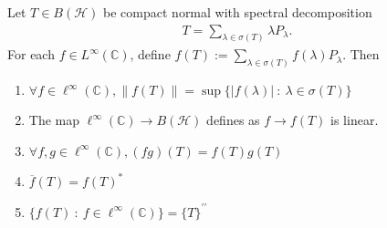 \begin{theorem}
  Let $T \in B(\mathcal{H})$ be compact normal with spectral decomposition
  \begin{align*}
    T = \sum_{\lambda \in  \sigma(T)} \lambda P_\lambda.
  \end{align*}
  For each $f \in L^\infty(\mathbb{C})$, define $f(T) := \sum_{ \lambda \in
  \sigma(T)}  f(\lambda)   P_\lambda$. Then
  \begin{enumerate}[label=(\arabic*)]
    \item $\forall f \in \ell^\infty(\mathbb{C}), \|f(T)\| = \sup \{
      |f(\lambda)|  \ : \  \lambda \in \sigma(T) \}$
    \item The map $\ell^\infty(\mathbb{C}) \to B(\mathcal{H})$
      defines as $f \to f(T)$ is linear.
    \item $\forall f, g \in \ell^\infty(\mathbb{C}), (fg)(T) = f(T)g(T)$
    \item $\overline{f}(T) = f(T)^*$
    \item $ \{ f(T)  \ : \   f \in \ell^\infty(\mathbb{C}) \} = \{ T
      \}^{\prime \prime}$
  \end{enumerate}
\end{theorem}
